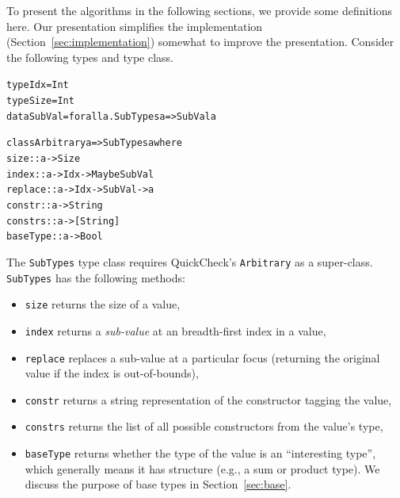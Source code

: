 \documentclass[10pt]{sigplanconf}
\newenvironment{code}{\begin{alltt}\small}{\end{alltt}}
\newcommand{\ttp}[1]{\texttt{#1}}
\begin{document}
To present the algorithms in the following sections, we provide some definitions
here.  Our presentation simplifies the implementation
(Section~\ref{sec:implementation}) somewhat to improve the presentation.
Consider the following types and type class.
%
\begin{code}
type Idx    = Int
type Size   = Int
data SubVal = forall a. SubTypes a => SubVal a

class Arbitrary a => SubTypes a where
  size     :: a -> Size
  index    :: a -> Idx -> Maybe SubVal
  replace  :: a -> Idx -> SubVal -> a
  constr   :: a -> String
  constrs  :: a -> [String]
  baseType :: a -> Bool
\end{code}
%
\noindent
The \ttp{SubTypes} type class requires QuickCheck's \ttp{Arbitrary} as a
super-class.  \ttp{SubTypes} has the following methods:
\begin{itemize}
\item \ttp{size} returns the size of a value,
\item \ttp{index} returns a \emph{sub-value} at an breadth-first index in a
  value,
\item \ttp{replace} replaces a sub-value at a particular focus (returning the
  original value if the index is out-of-bounds),
\item \ttp{constr} returns a string representation of the constructor tagging
  the value,
\item \ttp{constrs} returns the list of all possible constructors from the
  value's type,
\item \ttp{baseType} returns whether the type of the value is an ``interesting
  type'', which generally means it has structure (e.g., a sum or product type).
  We discuss the purpose of base types in Section~\ref{sec:base}.
\end{itemize}
\end{document}
